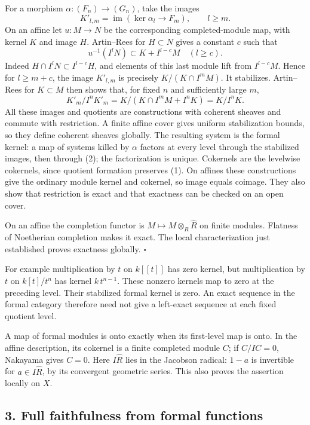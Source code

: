 \documentclass[11pt]{article}
\begin{document}
For a morphism \(\alpha:(F_n)\to(G_n)\), take the images \[
K'_{l,m}=\operatorname{im}(\ker\alpha_l\to F_m),\qquad l\geq m.
\] On an affine let \(u:M\to N\) be the corresponding completed-module
map, with kernel \(K\) and image \(H\). Artin--Rees for \(H\subset N\)
gives a constant \(c\) such that \[
u^{-1}(I^lN)\subset K+I^{l-c}M\quad(l\geq c).
\] Indeed \(H\cap I^lN\subset I^{l-c}H\), and elements of this last
module lift from \(I^{l-c}M\). Hence for \(l\geq m+c\), the image
\(K'_{l,m}\) is precisely \(K/(K\cap I^mM)\). It stabilizes. Artin--Rees
for \(K\subset M\) then shows that, for fixed \(n\) and sufficiently
large \(m\), \[
K'_m/I^nK'_m
=K/(K\cap I^mM+I^nK)=K/I^nK.
\tag{2}
\] All these images and quotients are constructions with coherent
sheaves and commute with restriction. A finite affine cover gives
uniform stabilization bounds, so they define coherent sheaves globally.
The resulting system is the formal kernel: a map of systems killed by
\(\alpha\) factors at every level through the stabilized images, then
through (2); the factorization is unique. Cokernels are the levelwise
cokernels, since quotient formation preserves (1). On affines these
constructions give the ordinary module kernel and cokernel, so image
equals coimage. They also show that restriction is exact and that
exactness can be checked on an open cover.

On an affine the completion functor is \(M\mapsto M\otimes_R\widehat R\)
on finite modules. Flatness of Noetherian completion makes it exact. The
local characterization just established proves exactness globally.
\(\square\)

For example multiplication by \(t\) on \(k[[t]]\) has zero kernel, but
multiplication by \(t\) on \(k[t]/t^n\) has kernel \(k\,t^{n-1}\). These
nonzero kernels map to zero at the preceding level. Their stabilized
formal kernel is zero. An exact sequence in the formal category
therefore need not give a left-exact sequence at each fixed quotient
level.

A map of formal modules is onto exactly when its first-level map is
onto. In the affine description, its cokernel is a finite completed
module \(C\); if \(C/IC=0\), Nakayama gives \(C=0\). Here
\(I\widehat R\) lies in the Jacobson radical: \(1-a\) is invertible for
\(a\in I\widehat R\), by its convergent geometric series. This also
proves the assertion locally on \(X\).

\subsection{3. Full faithfulness from formal
functions}\label{full-faithfulness-from-formal-functions}
\end{document}
